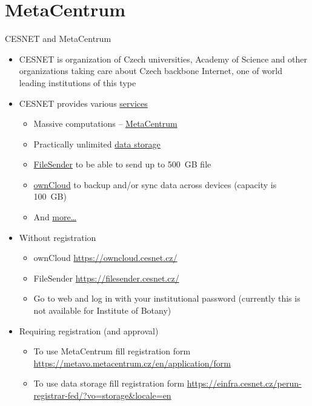 \documentclass[compress, ucs, xelatex, 11pt, xcolor=svgnames,
  hyperref={
    bookmarks=true,
    unicode=true,
    colorlinks=true,
    pdftitle={Linux, command line and MetaCentrum},
    plainpages=false,
    pdfauthor={Vojtech Zeisek},
    pdfsubject={Course about use of Linux command line, writing shell scripts and using MetaCentrum of CESNET},
    pdfcreator={XeLaTeX},
    pdfkeywords={Linux, GNU, BASH, shell, command line, MetaCentrum},
    linkcolor=Red,
    anchorcolor=Blue,
    citecolor=Purple,
    filecolor=DodgerBlue,
    menucolor=DarkOrchid,
    urlcolor=DeepSkyBlue,
    pdftex},
  url={hyphens, lowtilde} %
  ]{beamer}
\begin{document}
\section{MetaCentrum}

\begin{frame}[allowframebreaks]{CESNET and MetaCentrum}
\begin{itemize}
  \item CESNET is organization of Czech universities, Academy of Science and other organizations taking care about Czech backbone Internet, one of world leading institutions of this type
  \item CESNET provides various \href{https://www.cesnet.cz/services/?lang=en}{services}
  \begin{itemize}
    \item Massive computations -- \href{https://www.cesnet.cz/services/massive-computations-metacentrum/?lang=en}{MetaCentrum}
    \item Practically unlimited \href{https://www.cesnet.cz/services/data-storage/?lang=en}{data storage}
    \item \href{https://www.cesnet.cz/services/filesender/?lang=en}{FileSender} to be able to send up to 500~GB file
    \item \href{https://www.cesnet.cz/services/owncloud/?lang=en}{ownCloud} to backup and/or sync data across devices (capacity is 100~GB)
    \item And \href{https://www.cesnet.cz/services/?lang=en}{more\ldots}
  \end{itemize}
  \item Without registration
  \begin{itemize}
    \item ownCloud \url{https://owncloud.cesnet.cz/}
    \item FileSender \url{https://filesender.cesnet.cz/}
    \item Go to web and log in with your institutional password (currently this is not available for Institute of Botany)
  \end{itemize}
  \item Requiring registration (and approval)
  \begin{itemize}
    \item To use MetaCentrum fill registration form \url{https://metavo.metacentrum.cz/en/application/form}
    \item To use data storage fill registration form \url{https://einfra.cesnet.cz/perun-registrar-fed/?vo=storage&locale=en}

\end{itemize}
\end{itemize}
\end{frame}
\end{document}

